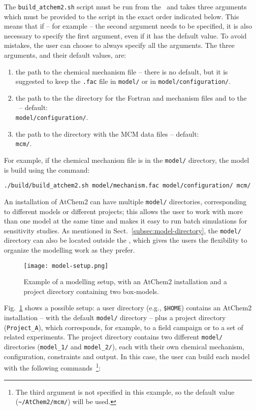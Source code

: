 The \texttt{build\_atchem2.sh} script must be run from the \maindir\
and takes three arguments which must be provided to the script in the
exact order indicated below. This means that if -- for example -- the
second argument needs to be specified, it is also necessary to specify
the first argument, even if it has the default value. To avoid
mistakes, the user can choose to always specify all the arguments. The
three arguments, and their default values, are:

\begin{enumerate}
\item the path to the chemical mechanism file -- there is no default,
  but it is suggested to keep the \texttt{.fac} file in
  \texttt{model/} or in \texttt{model/configuration/}.
\item the path to the the directory for the Fortran and mechanism
  files and to the \sharedir\ -- default:\\
  \texttt{model/configuration/}.
\item the path to the directory with the MCM data files -- default:\\
  \texttt{mcm/}.
\end{enumerate}

For example, if the chemical mechanism file is in the \texttt{model/}
directory, the model is build using the command:

\begin{verbatim}
./build/build_atchem2.sh model/mechanism.fac model/configuration/ mcm/
\end{verbatim}

An installation of AtChem2 can have multiple \texttt{model/}
directories, corresponding to different models or different projects;
this allows the user to work with more than one model at the same time
and makes it easy to run batch simulations for sensitivity studies. As
mentioned in Sect.~\ref{subsec:model-directory}, the \texttt{model/}
directory can also be located outside the \maindir, which gives the
users the flexibility to organize the modelling work as they prefer.

\begin{figure}[htb]
  \centering
  \texttt{[image: model-setup.png]}
  \caption{Example of a modelling setup, with an AtChem2 installation
    and a project directory containing two box-models.}
  \label{fig:setup}
\end{figure}

Fig.~\ref{fig:setup} shows a possible setup: a user directory (e.g.,
\texttt{\$HOME}) contains an AtChem2 installation -- with the default
\texttt{model/} directory -- plus a project directory
(\texttt{Project\_A}), which corresponds, for example, to a field
campaign or to a set of related experiments. The project directory
contains two different \texttt{model/} directories (\texttt{model\_1/}
and \texttt{model\_2/}), each with their own chemical mechanism,
configuration, constraints and output. In this case, the user can
build each model with the following commands~\footnote{The third
  argument is not specified in this example, so the default value
  (\texttt{\textasciitilde/AtChem2/mcm/}) will be used.}:

